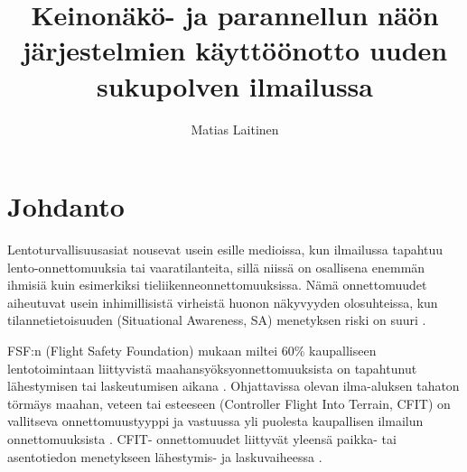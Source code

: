 \documentclass[utf8,bachelor,manualbib]{gradu3}
\begin{document}
\title{Keinonäkö- ja parannellun näön järjestelmien käyttöönotto uuden sukupolven ilmailussa}




\author{Matias Laitinen}


\maketitle
  
\mainmatter

\chapter{Johdanto}

Lentoturvallisuusasiat nousevat usein esille medioissa, kun ilmailussa tapahtuu lento-onnettomuuksia tai vaaratilanteita, sillä niissä on osallisena enemmän ihmisiä kuin esimerkiksi tieliikenneonnettomuuksissa. Nämä onnettomuudet aiheutuvat usein inhimillisistä virheistä huonon näkyvyyden olosuhteissa, kun tilannetietoisuuden (Situational Awareness, SA) menetyksen riski on suuri \citep{kimkaber2014, prinzelym2013, schnellym2004, vygolov2013}.

FSF:n (Flight Safety Foundation) mukaan miltei 60\% kaupalliseen lentotoimintaan liittyvistä maahansyöksyonnettomuuksista on tapahtunut lähestymisen tai laskeutumisen aikana \cite{schnellym2004, kimkaber2014}. Ohjattavissa olevan ilma-aluksen tahaton törmäys maahan, veteen tai esteeseen (Controller Flight Into Terrain, CFIT) on vallitseva onnettomuustyyppi ja vastuussa yli puolesta kaupallisen ilmailun onnettomuuksista \citep{etherington2000}. CFIT- onnettomuudet liittyvät yleensä paikka- tai asentotiedon menetykseen lähestymis- ja laskuvaiheessa \cite{schnellym2004}.
\end{document}
